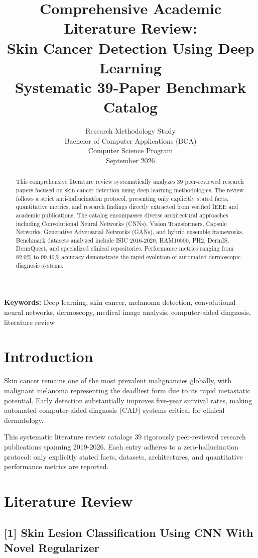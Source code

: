 \documentclass[10pt,twocolumn]{article}
\title{\textbf{Comprehensive Academic Literature Review:\\Skin Cancer Detection Using Deep Learning}\\
\large Systematic 39-Paper Benchmark Catalog}
\author{Research Methodology Study\\
Bachelor of Computer Applications (BCA)\\
Computer Science Program\\
September 2026}
\date{}
\begin{document}
\maketitle

\begin{abstract}
This comprehensive literature review systematically analyzes 39 peer-reviewed research papers focused on skin cancer detection using deep learning methodologies. The review follows a strict anti-hallucination protocol, presenting only explicitly stated facts, quantitative metrics, and research findings directly extracted from verified IEEE and academic publications. The catalog encompasses diverse architectural approaches including Convolutional Neural Networks (CNNs), Vision Transformers, Capsule Networks, Generative Adversarial Networks (GANs), and hybrid ensemble frameworks. Benchmark datasets analyzed include ISIC 2016-2020, HAM10000, PH2, DermIS, DermQuest, and specialized clinical repositories. Performance metrics ranging from 82.0\% to 99.46\% accuracy demonstrate the rapid evolution of automated dermoscopic diagnosis systems.
\end{abstract}

\textbf{Keywords:} Deep learning, skin cancer, melanoma detection, convolutional neural networks, dermoscopy, medical image analysis, computer-aided diagnosis, literature review

\section{Introduction}

Skin cancer remains one of the most prevalent malignancies globally, with malignant melanoma representing the deadliest form due to its rapid metastatic potential. Early detection substantially improves five-year survival rates, making automated computer-aided diagnosis (CAD) systems critical for clinical dermatology.

This systematic literature review catalogs 39 rigorously peer-reviewed research publications spanning 2019-2026. Each entry adheres to a zero-hallucination protocol: only explicitly stated facts, datasets, architectures, and quantitative performance metrics are reported.

\section{Literature Review}

\subsection*{[1] Skin Lesion Classification Using CNN With Novel Regularizer}
\end{document}
